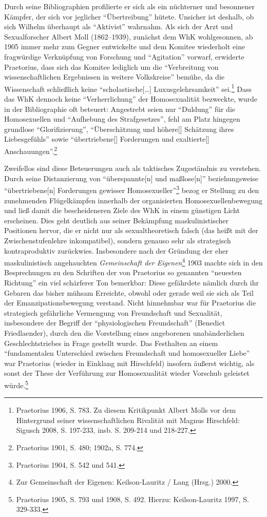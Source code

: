 \documentclass[a4paper,
fontsize=11pt,
oneside,
numbers=noperiodatend,
parskip=half-,
bibliography=totoc,
final
]{scrartcl}
\begin{document}
Durch seine Bibliographien profilierte er sich als ein nüchterner und
besonnener Kämpfer, der sich vor jeglicher \enquote{Übertreibung}
hütete. Unsicher ist deshalb, ob sich Wilhelm überhaupt als
\enquote{Aktivist} wahrnahm. Als sich der Arzt und Sexualforscher Albert
Moll (1862--1939), zunächst dem WhK wohlgesonnen, ab 1905 immer mehr zum
Gegner entwickelte und dem Komitee wiederholt eine fragwürdige
Verknüpfung von Forschung und \enquote{Agitation} vorwarf, erwiderte
Praetorius, dass sich das Komitee lediglich um die \enquote{Verbreitung
von wissenschaftlichen Ergebnissen in weitere Volkskreise} bemühe, da
die Wissenschaft schließlich keine \enquote{scholastische{[}\ldots{}{]}
Luxusgelehrsamkeit} sei.\footnote{Praetorius 1906, S. 783. Zu diesem
  Kritikpunkt Albert Molls vor dem Hintergrund seiner wissenschaftlichen
  Rivalität mit Magnus Hirschfeld: Sigusch 2008, S. 197-233, insb. S.
  209-214 und 218-227.} Dass das WhK dennoch keine
\enquote{Verherrlichung} der Homosexualität bezweckte, wurde in der
Bibliographie oft beteuert: Angestrebt seien nur \enquote{Duldung} für
die Homosexuellen und \enquote{Aufhebung des Strafgesetzes}, fehl am
Platz hingegen grundlose \enquote{Glorifizierung},
\enquote{Überschätzung und höhere{[}{]} Schätzung ihres Liebesgefühls}
sowie \enquote{übertriebene{[}{]} Forderungen und exaltierte{[}{]}
Anschauungen}.\footnote{Praetorius 1901, S. 480; 1902a, S. 774.}

Zweifellos sind diese Beteuerungen auch als taktisches Zugeständnis zu
verstehen. Durch seine Distanzierung von \enquote{überspannte{[}n{]} und
maßlose{[}n{]}} beziehungsweise \enquote{übertriebene{[}n{]} Forderungen
gewisser Homosexueller}\footnote{Praetorius 1904, S. 542 und 541.} bezog
er Stellung zu den zunehmenden Flügelkämpfen innerhalb der organisierten
Homosexuellenbewegung und ließ damit die bescheideneren Ziele des WhK in
einem günstigen Licht erscheinen. Dies geht deutlich aus seiner
Bekämpfung maskulinistischer Positionen hervor, die er nicht nur als
sexualtheoretisch falsch (das heißt mit der Zwischenstufenlehre
inkompatibel), sondern genauso sehr als strategisch kontraproduktiv
zurückwies. Insbesondere nach der Gründung der eher maskulinistisch
angehauchten \emph{Gemeinschaft der Eigenen}\footnote{Zur Gemeinschaft
  der Eigenen: Keilson-Lauritz / Lang (Hrsg.) 2000.} 1903 machte sich in
den Besprechungen zu den Schriften der von Praetorius so genannten
\enquote{neuesten Richtung} ein viel schärferer Ton bemerkbar: Diese
gefährdete nämlich durch ihr Gebaren das bisher mühsam Erreichte, obwohl
oder gerade weil sie sich als Teil der Emanzipationsbewegung verstand.
Nicht hinnehmbar war für Praetorius die strategisch gefährliche
Vermengung von Freundschaft und Sexualität, insbesondere der Begriff der
\enquote{physiologischen Freundschaft} (Benedict Friedlaender), durch
den die Vorstellung eines angeborenen unabänderlichen Geschlechtstriebes
in Frage gestellt wurde. Das Festhalten an einem \enquote{fundamentalen
Unterschied zwischen Freundschaft und homosexueller Liebe} war
Praetorius (wieder in Einklang mit Hirschfeld) insofern äußerst wichtig,
als sonst der These der Verführung zur Homosexualität wieder Vorschub
geleistet würde.\footnote{Praetorius 1905, S. 793 und 1908, S. 492.
  Hierzu: Keilson-Lauritz 1997, S. 329-333.}
\end{document}
